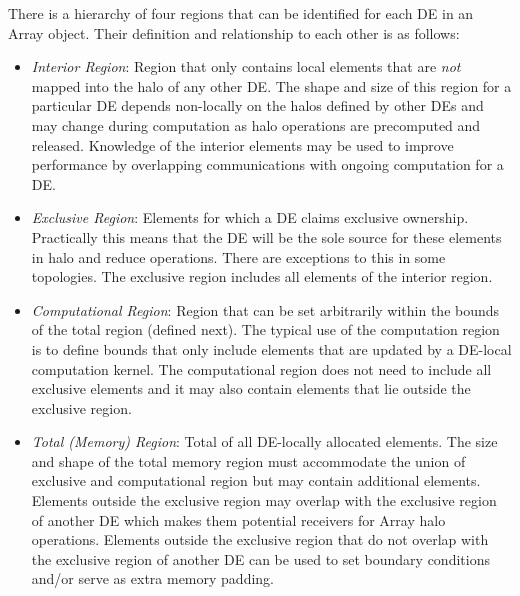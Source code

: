    There is a hierarchy of four regions that can be identified for each DE in an
   Array object. Their definition and relationship to each other is as follows:
   \begin{itemize}
   \item {\em Interior Region}: Region that only contains local elements that are
         {\em not} mapped into the halo of any other DE. The shape and size of 
         this region for a particular DE depends non-locally on the halos defined
         by other DEs and may change during computation as halo operations are
         precomputed and released. Knowledge of the interior elements may be used
         to improve performance by overlapping communications with ongoing 
         computation for a DE.
   \item {\em Exclusive Region}: Elements for which a DE claims exclusive
         ownership. Practically this means that the DE will be the sole source
         for these elements in halo and reduce operations. There are exceptions
         to this in some topologies. The exclusive region includes all elements
         of the interior region.
   \item {\em Computational Region}: Region that can be set arbitrarily within
         the bounds of the total region (defined next). The typical use of the
         computation region is to define bounds that only include elements that
         are updated by a DE-local computation kernel. The computational region
         does not need to include all exclusive elements and it may also contain
         elements that lie outside the exclusive region.
   \item {\em Total (Memory) Region}: Total of all DE-locally allocated elements.
         The size and shape of the total memory region must accommodate the
         union of exclusive and computational region but may contain 
         additional elements. Elements outside the exclusive region may overlap
         with the exclusive region of another DE which makes them potential 
         receivers for Array halo operations. Elements outside the exclusive
         region that do not overlap with the exclusive region of another DE
         can be used to set boundary conditions and/or serve as extra memory 
         padding.
   \end{itemize}
  
